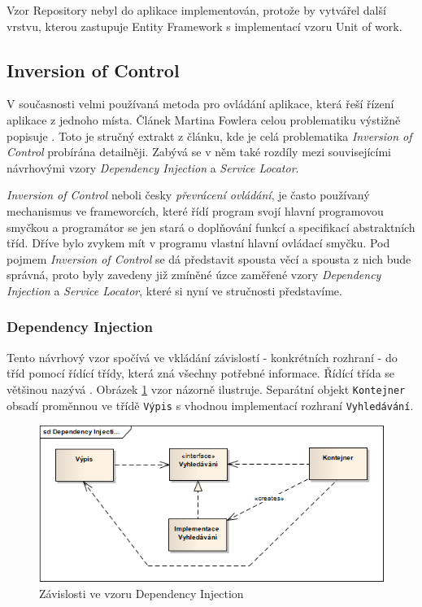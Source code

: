 \documentclass[11pt,twoside,a4paper]{book}
\begin{document}
Vzor Repository nebyl do aplikace implementován, protože by vytvářel další vrstvu, kterou zastupuje Entity Framework s implementací vzoru Unit of work.

\subsection{Inversion of Control}

V současnosti velmi používaná metoda pro ovládání aplikace, která řeší řízení aplikace z jednoho místa. Článek Martina Fowlera celou  problematiku výstižně popisuje \cite{injection}. Toto je stručný extrakt z článku, kde je celá problematika \textit{Inversion of Control} probírána detailněji. Zabývá se v něm také rozdíly mezi souvisejícími návrhovými vzory \textit{Dependency Injection} a \textit{Service Locator}.

\textit{Inversion of Control} neboli česky \textit{převrácení ovládání}, je často používaný mechanismus ve frameworcích, které řídí program svojí hlavní programovou smyčkou a programátor se jen stará o doplňování funkcí a specifikací abstraktních tříd. Dříve bylo zvykem mít v programu vlastní hlavní ovládací smyčku. Pod pojmem \textit{Inversion of Control} se dá představit spousta věcí a spousta z nich bude správná, proto byly zavedeny již zmíněné úzce zaměřené vzory \textit{Dependency Injection} a \textit{Service Locator}, které si nyní ve stručnosti představíme.

\subsubsection{Dependency Injection}
Tento návrhový vzor spočívá ve vkládání závislostí - konkrétních rozhraní - do tříd pomocí řídící třídy, která zná všechny potřebné informace. Řídící třída se většinou nazývá . Obrázek \ref{fig:di} vzor názorně ilustruje. Separátní objekt \texttt{Kontejner} obsadí proměnnou ve třídě \texttt{Výpis} s vhodnou implementací rozhraní \texttt{Vyhledávání}.

\begin{figure}[h!]
\begin{center}
\includegraphics[scale=0.75]{figures/di}
\caption{Závislosti ve vzoru Dependency Injection}
\label{fig:di}
\end{center}
\end{figure}
\end{document}
